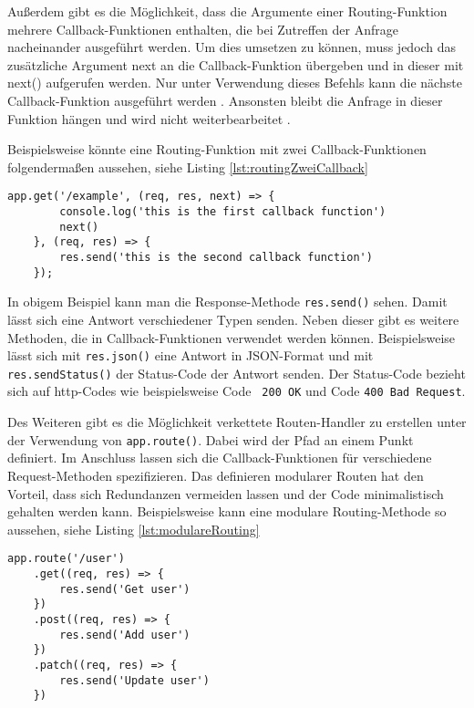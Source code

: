 Außerdem gibt es die Möglichkeit, dass die Argumente einer Routing-Funktion mehrere Callback-Funktionen enthalten, die bei Zutreffen der Anfrage nacheinander ausgeführt werden. Um dies umsetzen zu können, muss jedoch das zusätzliche Argument \glqq next\grqq{} an die Callback-Funktion übergeben und in dieser mit next() aufgerufen werden. Nur unter Verwendung dieses Befehls kann die nächste Callback-Funktion ausgeführt werden \cite{nfunf}. Ansonsten bleibt die Anfrage in dieser Funktion hängen und wird nicht weiterbearbeitet \cite{nsechs}.

Beispielsweise könnte eine Routing-Funktion mit zwei Callback-Funktionen folgendermaßen aussehen, siehe Listing \ref*{lst:routingZweiCallback}

\begin{lstlisting}[caption={Routing-Funktion mit zwei Callback-Funktionen}, label={lst:routingZweiCallback}]
    app.get('/example', (req, res, next) => {
        console.log('this is the first callback function')
        next()
    }, (req, res) => {
        res.send('this is the second callback function')
    });
\end{lstlisting}

In obigem Beispiel kann man die Response-Methode \texttt{res.send()} sehen. Damit lässt sich eine Antwort verschiedener Typen senden. Neben dieser gibt es weitere Methoden, die in Callback-Funktionen verwendet werden können. Beispielsweise lässt sich mit \texttt{res.json()} eine Antwort in JSON-Format und mit \texttt{res.sendStatus()} der Status-Code der Antwort senden. Der Status-Code bezieht sich auf http-Codes wie beispielsweise Code  \texttt{ 200 OK} und Code  \texttt{400 Bad Request}.

Des Weiteren gibt es die Möglichkeit verkettete Routen-Handler zu erstellen unter der Verwendung von \texttt{app.route()}. Dabei wird der Pfad an einem Punkt definiert. Im Anschluss lassen sich die Callback-Funktionen für verschiedene Request-Methoden spezifizieren. Das definieren modularer Routen hat den Vorteil, dass sich Redundanzen vermeiden lassen und der Code minimalistisch gehalten werden kann. 
Beispielsweise kann eine modulare Routing-Methode so aussehen, siehe Listing \ref*{lst:modulareRouting}

\begin{lstlisting}[caption={modulare Routing Methode \cite{nfunf}}, label={lst:modulareRouting}]
    app.route('/user')
    .get((req, res) => {
        res.send('Get user')
    })
    .post((req, res) => {
        res.send('Add user')
    })
    .patch((req, res) => {
        res.send('Update user')
    })
\end{lstlisting}


